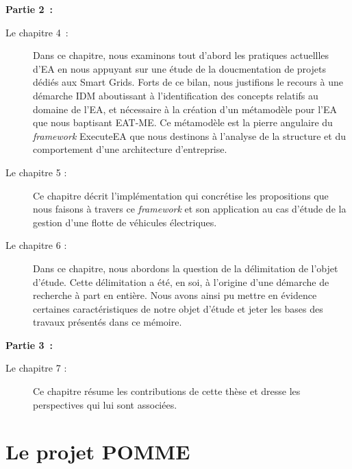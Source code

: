 \textbf{Partie 2~: }

    \begin{description}

        \item[Le chapitre 4~: ] Dans ce chapitre, nous examinons tout d'abord les pratiques actuellles d'EA
en nous appuyant sur une étude de la doucmentation de projets dédiés aux Smart Grids.
Forts de ce bilan, nous justifions le recours à une démarche IDM aboutissant à l'identification des concepts
relatifs au domaine de l'EA, et nécessaire à la création d'un métamodèle pour l'EA que nous
baptisant EAT-ME. Ce métamodèle est la pierre angulaire du \emph{framework} ExecuteEA que nous
destinons à l'analyse de la structure et du comportement d'une architecture d'entreprise. 

        \item[Le chapitre 5 : ] Ce chapitre décrit l'implémentation qui concrétise
les propositions que nous faisons à travers ce \emph{framework} et son application au cas d'étude de la gestion d'une
flotte de véhicules électriques.

        \item[Le chapitre 6 : ] Dans ce chapitre, nous abordons la question de la délimitation de l'objet d'étude.
Cette délimitation a été, en soi, à l'origine d'une démarche de recherche à part en entière. Nous avons ainsi pu mettre en évidence certaines caractéristiques de notre objet d'étude et jeter les bases des travaux présentés dans ce mémoire.  

    \end{description}

\textbf{Partie 3~: }

    \begin{description}

        \item[Le chapitre 7 : ] Ce chapitre résume les contributions de cette thèse et dresse les perspectives qui lui sont associées.

    \end{description}



\section{Le projet POMME}

